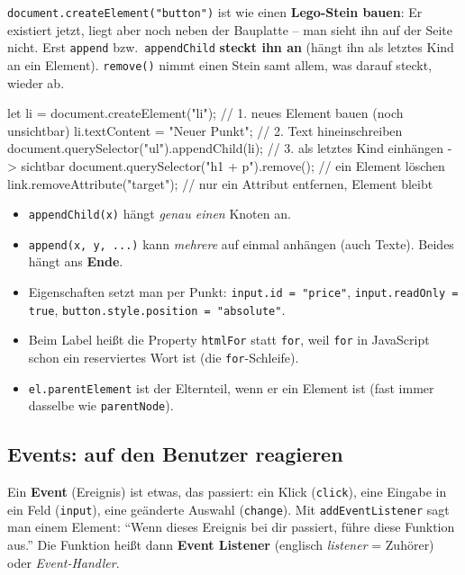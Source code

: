 \documentclass[a4paper,11pt]{article}
\begin{document}
\begin{analogie}
\lstinline|document.createElement("button")| ist wie einen \textbf{Lego-Stein bauen}: Er existiert jetzt, liegt aber
noch neben der Bauplatte -- man sieht ihn auf der Seite nicht. Erst \lstinline|append| bzw.\ \lstinline|appendChild|
\textbf{steckt ihn an} (hängt ihn als letztes Kind an ein Element). \lstinline|remove()| nimmt einen Stein samt
allem, was darauf steckt, wieder ab.
\end{analogie}

\begin{code}
let li = document.createElement("li");   // 1. neues Element bauen (noch unsichtbar)
li.textContent = "Neuer Punkt";          // 2. Text hineinschreiben
document.querySelector("ul").appendChild(li);  // 3. als letztes Kind einhängen -> sichtbar
document.querySelector("h1 + p").remove();     // ein Element löschen
link.removeAttribute("target");          // nur ein Attribut entfernen, Element bleibt
\end{code}

\begin{itemize}[nosep]
\item \lstinline|appendChild(x)| hängt \emph{genau einen} Knoten an.
\item \lstinline|append(x, y, ...)| kann \emph{mehrere} auf einmal anhängen (auch Texte). Beides hängt ans \textbf{Ende}.
\item Eigenschaften setzt man per Punkt: \lstinline|input.id = "price"|, \lstinline|input.readOnly = true|,
      \lstinline|button.style.position = "absolute"|.
\item Beim Label heißt die Property \lstinline|htmlFor| statt \texttt{for}, weil \texttt{for} in JavaScript schon
      ein reserviertes Wort ist (die \texttt{for}-Schleife).
\item \lstinline|el.parentElement| ist der Elternteil, wenn er ein Element ist (fast immer dasselbe wie \texttt{parentNode}).
\end{itemize}

\subsection{Events: auf den Benutzer reagieren}\label{sec:events}

Ein \textbf{Event} (Ereignis) ist etwas, das passiert: ein Klick (\texttt{click}), eine Eingabe in ein Feld
(\texttt{input}), eine geänderte Auswahl (\texttt{change}). Mit \lstinline|addEventListener| sagt man einem Element:
"`Wenn dieses Ereignis bei dir passiert, führe diese Funktion aus."' Die Funktion heißt dann
\textbf{Event Listener} (englisch \emph{listener} = Zuhörer) oder \emph{Event-Handler}.
\end{document}
